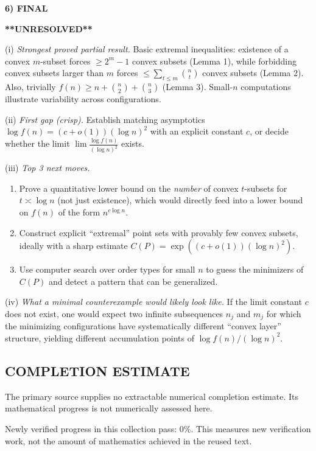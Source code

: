 \medskip
\noindent\textbf{6) FINAL}

\textbf{**UNRESOLVED**}

(i) \emph{Strongest proved partial result.} Basic extremal inequalities: existence of a convex $m$-subset forces $\ge 2^m-1$ convex subsets (Lemma 1), while forbidding convex subsets larger than $m$ forces $\le \sum_{t\le m}\binom{n}{t}$ convex subsets (Lemma 2). Also, trivially $f(n)\ge n+\binom{n}{2}+\binom{n}{3}$ (Lemma 3). Small-$n$ computations illustrate variability across configurations.

(ii) \emph{First gap (crisp).} Establish matching asymptotics $\log f(n) = (c+o(1))(\log n)^2$ with an explicit constant $c$, or decide whether the limit $\lim \frac{\log f(n)}{(\log n)^2}$ exists.

(iii) \emph{Top 3 next moves.}
\begin{enumerate}
\item Prove a quantitative lower bound on the \emph{number} of convex $t$-subsets for $t\asymp \log n$ (not just existence), which would directly feed into a lower bound on $f(n)$ of the form $n^{c\log n}$.
\item Construct explicit ``extremal'' point sets with provably few convex subsets, ideally with a sharp estimate $C(P)=\exp((c+o(1))(\log n)^2)$.
\item Use computer search over order types for small $n$ to guess the minimizers of $C(P)$ and detect a pattern that can be generalized.
\end{enumerate}

(iv) \emph{What a minimal counterexample would likely look like.} If the limit constant $c$ does not exist, one would expect two infinite subsequences $n_j$ and $m_j$ for which the minimizing configurations have systematically different ``convex layer'' structure, yielding different accumulation points of $\log f(n)/(\log n)^2$.




\subsection*{COMPLETION ESTIMATE}
The primary source supplies no extractable numerical completion estimate. Its mathematical progress is not numerically assessed here.

Newly verified progress in this collection pass: $0\%$. This measures new verification work, not the amount of mathematics achieved in the reused text.
